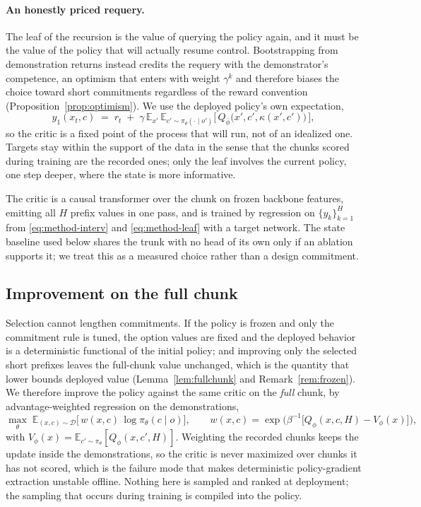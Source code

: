 \paragraph{An honestly priced requery.}
The leaf of the recursion is the value of querying the policy again, and it must be the value of
the policy that will actually resume control. Bootstrapping from demonstration returns instead
credits the requery with the demonstrator's competence, an optimism that enters with weight
$\gamma^{k}$ and therefore biases the choice toward short commitments regardless of the reward
convention (Proposition~\ref{prop:optimism}). We use the deployed policy's own expectation,
\begin{equation}
\label{eq:method-leaf}
y_1(x_t, c) \;=\; r_t \;+\; \gamma\, \mathbb E_{x'}\,\mathbb E_{c'\sim\pi_\theta(\cdot\mid o')}
\big[\, Q_{\bar\phi}\big(x', c', \kappa(x', c')\big) \,\big],
\end{equation}
so the critic is a fixed point of the process that will run, not of an idealized one. Targets stay
within the support of the data in the sense that the chunks scored during training are the recorded
ones; only the leaf involves the current policy, one step deeper, where the state is more
informative.

The critic is a causal transformer over the chunk on frozen backbone features, emitting all $H$
prefix values in one pass, and is trained by regression on
$\{y_k\}_{k=1}^{H}$ from \eqref{eq:method-interv} and \eqref{eq:method-leaf} with a target network.
The state baseline used below shares the trunk with no head of its own only if an ablation supports
it; we treat this as a measured choice rather than a design commitment.

\subsection{Improvement on the full chunk}
\label{sec:method:actor}

Selection cannot lengthen commitments. If the policy is frozen and only the commitment rule is
tuned, the option values are fixed and the deployed behavior is a deterministic functional of the
initial policy; and improving only the selected short prefixes leaves the full-chunk value
unchanged, which is the quantity that lower bounds deployed value
(Lemma~\ref{lem:fullchunk} and Remark~\ref{rem:frozen}). We therefore improve the policy against
the same critic on the \emph{full} chunk, by advantage-weighted regression on the demonstrations,
\begin{equation}
\label{eq:method-actor}
\max_\theta\; \mathbb E_{(x, c)\sim\mathcal D}\Big[\,
w(x,c)\,\log \pi_\theta(c \mid o)\Big],
\qquad
w(x,c)=\exp\!\big(\beta^{-1}\big[Q_\phi(x, c, H)-V_\phi(x)\big]\big),
\end{equation}
with $V_\phi(x)=\mathbb E_{c'\sim\pi_\theta}[Q_\phi(x,c',H)]$. Weighting the recorded chunks keeps
the update inside the demonstrations, so the critic is never maximized over chunks it has not
scored, which is the failure mode that makes deterministic policy-gradient extraction unstable
offline. Nothing here is sampled and ranked at deployment; the sampling that occurs during training
is compiled into the policy.

